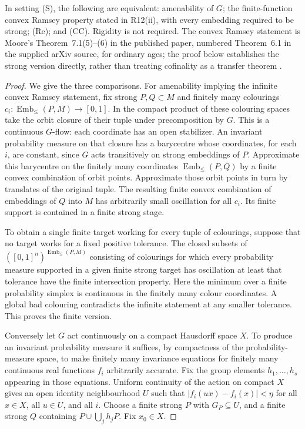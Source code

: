 \begin{theorem}
\label{A:convex}
In setting (S), the following are equivalent: amenability of $G$;
the finite-function convex Ramsey property stated in R12(ii), with
every embedding required to be strong; (Re); and (CC). Rigidity is
not required. The convex Ramsey statement is Moore's
Theorem~7.1(5)--(6) in the published paper, numbered
Theorem~6.1 in the supplied arXiv source, for ordinary ages; the proof below establishes the
strong version directly, rather than treating cofinality as a transfer
theorem \cite{ABMoore2013}.
\end{theorem}
\begin{proof}
We give the three comparisons. For amenability implying the infinite
convex Ramsey statement, fix strong $P,Q\subset M$ and finitely many
colourings $c_i:\operatorname{Emb}_{\leq}(P,M)\to[0,1]$. In the compact
product of these colouring spaces take the orbit closure of their
tuple under precomposition by $G$. This is a continuous $G$-flow:
each coordinate has an open stabilizer. An invariant probability
measure on that closure has a barycentre whose coordinates, for each
$i$, are constant, since $G$ acts transitively on strong embeddings
of $P$. Approximate this barycentre on the finitely many coordinates
$\operatorname{Emb}_{\leq}(P,Q)$ by a finite convex combination of
orbit points. Approximate those orbit points in turn by translates
of the original tuple. The resulting finite convex combination of
embeddings of $Q$ into $M$ has arbitrarily small oscillation for all
$c_i$. Its finite support is contained in a finite strong stage.

To obtain a single finite target working for every tuple of
colourings, suppose that no target works for a fixed positive
tolerance. The closed subsets of
$([0,1]^n)^{\operatorname{Emb}_{\leq}(P,M)}$ consisting of colourings
for which every probability measure supported in a given finite
strong target has oscillation at least that tolerance have the
finite intersection property. Here the minimum over a finite
probability simplex is continuous in the finitely many colour
coordinates. A global bad colouring contradicts the infinite
statement at any smaller tolerance. This proves the finite version.

Conversely let $G$ act continuously on a compact Hausdorff space $X$.
To produce an invariant probability measure it suffices, by
compactness of the probability-measure space, to make finitely many
invariance equations for finitely many continuous real functions
$f_i$ arbitrarily accurate. Fix the group elements $h_1,\ldots,h_s$
appearing in those equations. Uniform continuity of the action on
compact $X$ gives an open identity neighbourhood $U$ such that
$|f_i(ux)-f_i(x)|<\eta$ for all $x\in X$, all $u\in U$, and all $i$.
Choose a finite strong $P$ with $G_P\subseteq U$, and a finite strong
$Q$ containing $P\cup\bigcup_jh_jP$. Fix $x_0\in X$.


\end{proof}
